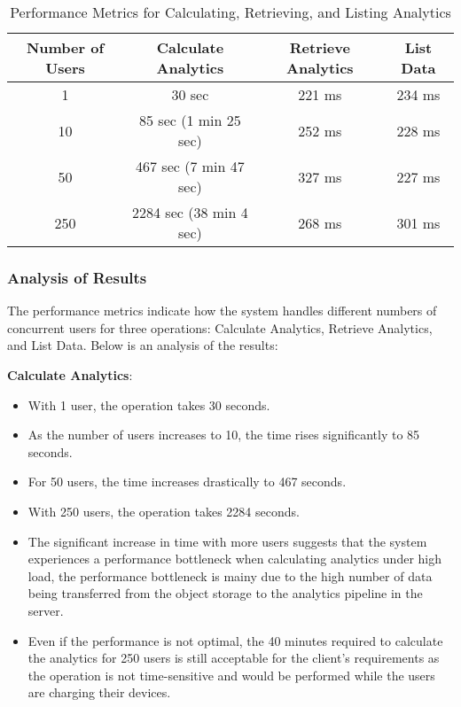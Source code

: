 \begin{table}[htbp]
\centering
\begin{tabular}{|c|c|c|c|}
\hline
\textbf{Number of Users} & \textbf{Calculate Analytics} & \textbf{Retrieve Analytics} & \textbf{List Data} \\
\hline 1 & 30 sec & 221 ms & 234 ms \\
\hline 10 & 85 sec (1 min 25 sec) & 252 ms & 228 ms \\
\hline 50 & 467 sec (7 min 47 sec) & 327 ms & 227 ms \\
\hline 250 & 2284 sec (38 min 4 sec) & 268 ms & 301 ms \\
\hline
\end{tabular}
\caption{Performance Metrics for Calculating, Retrieving, and Listing Analytics}
\label{table}
\end{table}

\subsubsection{Analysis of Results}
The performance metrics indicate how the system handles different numbers of concurrent users for three operations: Calculate Analytics, Retrieve Analytics, and List Data. Below is an analysis of the results:
{
\beginitemize}
\item \textbf{Calculate Analytics}:
    \begin{itemize}
    \item With 1 user, the operation takes 30 seconds.
    \item As the number of users increases to 10, the time rises significantly to 85 seconds.
    \item For 50 users, the time increases drastically to 467 seconds.
    \item With 250 users, the operation takes 2284 seconds.
    \item The significant increase in time with more users suggests that the system experiences a performance bottleneck when calculating analytics under high load, the performance bottleneck is mainy due to the high number of data being transferred from the object storage to the analytics pipeline in the server.
    \item Even if the performance is not optimal, the 40 minutes required to calculate the analytics for 250 users is still acceptable for the client's requirements as the operation is not time-sensitive and would be performed while the users are charging their devices.
    \end{itemize}

